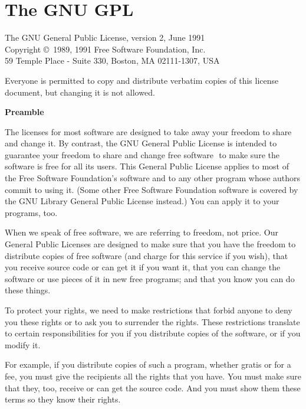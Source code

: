 \chapter[The GNU General Public License]{The GNU GPL}\label{appendix:license}

{\small
{\raggedright The GNU General Public License, version 2, June 1991\\
Copyright \copyright\ 1989, 1991 Free Software Foundation, Inc.\\
59 Temple Place - Suite 330, Boston, MA  02111-1307, USA}

\noindent Everyone is permitted to copy and distribute verbatim copies
of this license document, but changing it is not allowed.

{\medskip\noindent\normalsize\textbf{Preamble}\smallskip}

\ifhevea\else\newlength{\id}\setlength{\id}{\parindent}\fi
\begin{allononepageforgodssake}
\ifhevea\else\setlength{\parindent}{\id}\fi
\noindent The licenses for most software are designed to take away your freedom
to share and change it.  By contrast, the GNU General Public License is intended
to guarantee your freedom to share and change free software\,\textemdash\ to make sure the
software is free for all its users.  This General Public License applies to most
of the Free Software Foundation's software and to any other program whose
authors commit to using it.  (Some other Free Software Foundation software is
covered by the GNU Library General Public License instead.)  You can apply it to
your programs, too.

When we speak of free software, we are referring to freedom, not price.
Our General Public Licenses are designed to make sure that you have the
freedom to distribute copies of free software (and charge for this service
if you wish), that you receive source code or can get it if you want it,
that you can change the software or use pieces of it in new free programs;
and that you know you can do these things.

To protect your rights, we need to make restrictions that forbid anyone to
deny you these rights or to ask you to surrender the rights.  These
restrictions translate to certain responsibilities for you if you
distribute copies of the software, or if you modify it.

For example, if you distribute copies of such a program, whether gratis or
for a fee, you must give the recipients all the rights that you have.  You
must make sure that they, too, receive or can get the source code.  And
you must show them these terms so they know their rights.


\end{allononepageforgodssake}}
